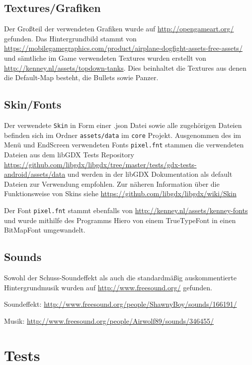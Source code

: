 \documentclass[a4paper]{scrreprt}
\def\code#1{\texttt{#1}}
\begin{document}
\subsection{Textures/Grafiken}
Der Großteil der verwendeten Grafiken wurde auf \url{http://opengameart.org/} gefunden.
Das Hintergrundbild stammt von 
\url{https://mobilegamegraphics.com/product/airplane-dogfight-assets-free-assets/} und sämtliche im Game verwendeten Textures wurden erstellt von \url{http://kenney.nl/assets/topdown-tanks}. Dies beinhaltet die Textures aus denen die Default-Map besteht, die Bullets sowie Panzer.

\subsection{Skin/Fonts}
Der verwendete \code{Skin} in Form einer .json Datei sowie alle zugehörigen Dateien befinden sich im Ordner \code{assets/data} im \code{core} Projekt. Ausgenommen des im Menü und EndScreen verwendeten Fonts \code{pixel.fnt} stammen die verwendeten Dateien aus dem libGDX Tests Repository \url{https://github.com/libgdx/libgdx/tree/master/tests/gdx-tests-android/assets/data} und werden in der libGDX Dokumentation als default Dateien zur Verwendung empfohlen. Zur näheren Information über die Funktionsweise von Skins siehe \url{https://github.com/libgdx/libgdx/wiki/Skin}

Der Font \code{pixel.fnt} stammt ebenfalls von \url{http://kenney.nl/assets/kenney-fonts} und wurde mithilfe des Programms Hiero von einem TrueTypeFont in einen BitMapFont umgewandelt.

\subsection{Sounds}
Sowohl der Schuss-Soundeffekt als auch die standardmäßig auskommentierte Hintergrundmusik wurden auf \url{http://www.freesound.org/} gefunden.

Soundeffekt: \url{http://www.freesound.org/people/ShawnyBoy/sounds/166191/}

Musik: \url{http://www.freesound.org/people/Airwolf89/sounds/346455/}

\newpage
\section{Tests}
\end{document}
